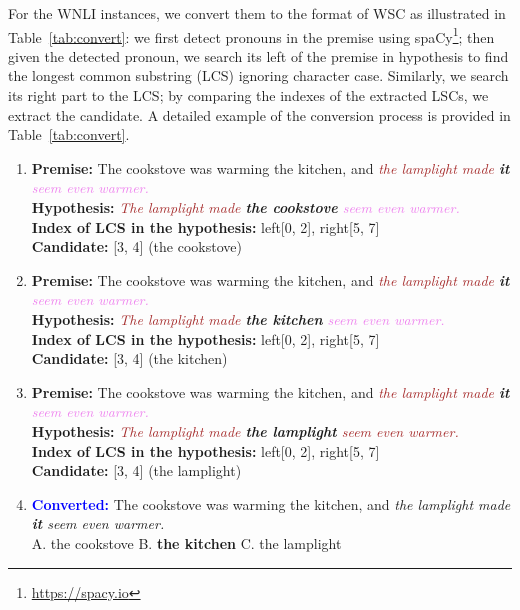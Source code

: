 \documentclass[11pt,a4paper]{article}
\newcommand{\wsc}{WSC}
\begin{document}
For the WNLI instances, we convert them to the format of {\wsc} as illustrated in Table~\ref{tab:convert}: we first detect pronouns in the premise using spaCy\footnote{\url{https://spacy.io}}; then given the detected pronoun, we search its left of the premise in hypothesis to find the longest common substring (LCS) ignoring character case. Similarly, we search its right part to the LCS; by comparing the indexes of the extracted LSCs, we extract the candidate. A detailed example of the conversion process is provided in Table~\ref{tab:convert}.
\begin{table}[!ht]
\begin{enumerate} 

\item \textbf{Premise:} The cookstove was warming the kitchen, and \textit{\textcolor{brown}{the lamplight made} \textbf{it} \textcolor{violet}{seem even warmer.}} \\
\textbf{Hypothesis:} \textit{\textcolor{brown}{The lamplight made} \textbf{the cookstove} \textcolor{violet}{seem even warmer.}} \\
\textbf{Index of LCS in the hypothesis:} left[0, 2], right[5, 7] \\
\textbf{Candidate:} [3, 4] (the cookstove)

\item \textbf{Premise:} The cookstove was warming the kitchen, and \textit{\textcolor{brown}{the lamplight made} \textbf{it} \textcolor{violet}{seem even warmer.}} \\
\textbf{Hypothesis:} \textit{\textcolor{brown}{The lamplight made} \textbf{the kitchen} \textcolor{violet}{seem even warmer.}} \\
\textbf{Index of LCS in the hypothesis:} left[0, 2], right[5, 7] \\
\textbf{Candidate:} [3, 4] (the kitchen)

\item \textbf{Premise:} The cookstove was warming the kitchen, and \textit{\textcolor{brown}{the lamplight made} \textbf{it} \textcolor{violet}{seem even warmer.}} \\
\textbf{Hypothesis:} \textit{\textcolor{brown}{The lamplight made} \textbf{the lamplight} \textcolor{brown}{seem even warmer.}}\\
\textbf{Index of LCS in the hypothesis:} left[0, 2], right[5, 7] \\
\textbf{Candidate:} [3, 4] (the lamplight)

\item \textbf{\textcolor{blue}{Converted:}} The cookstove was warming the kitchen, and \textit{the lamplight made \textbf{it} seem even warmer.} 
 \\
A. the cookstove\hspace{0.01\textwidth} B. \textbf{the kitchen} \hspace{0.01\textwidth} C. the lamplight


\end{enumerate}
\end{table}
\end{document}
